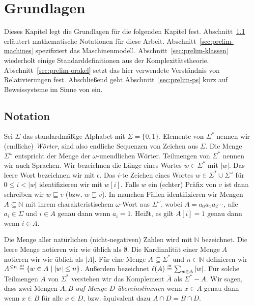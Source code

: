 \chapter{Grundlagen}\label{chap:prelim}

Dieses Kapitel legt die Grundlagen für die folgenden Kapitel fest. Abschnitt~\ref{sec:notation} erläutert mathematische Notationen für diese Arbeit. Abschnitt~\ref{sec:prelim-machines} spezifiziert das Maschinenmodell.  Abschnitt~\ref{sec:prelim-klassen} wiederholt einige Standarddefinitionen aus der Komplexitätstheorie. Abschnitt~\ref{sec:prelim-orakel} setzt das hier verwendete Verständnis von Relativierungen fest. Abschließend geht Abschnitt~\ref{sec:prelim-ps} kurz auf Beweissysteme im Sinne von \textcite{cook_relative_1979} ein.

\section{Notation}\label{sec:notation}

Sei $\Sigma$ das standardmäßige Alphabet mit $\Sigma=\{0,1\}$. Elemente von $\Sigma^*$ nennen wir (endliche) \emph{Wörter}, sind also endliche Sequenzen von Zeichen aus $\Sigma$. Die Menge $\Sigma^\omega$ entspricht der Menge der $\omega$-unendlichen Wörter. Teilmengen von $\Sigma^*$ nennen wir auch Sprachen. Wir bezeichnen die Länge eines Wortes $w\in\Sigma^*$ mit $|w|$. Das leere Wort bezeichnen wir mit $\epsilon$. Das $i$-te Zeichen eines Wortes $w\in\Sigma^*\cup\Sigma^\omega$ für $0\leq i< |w|$ identifizieren wir mit $w[i]$. 
Falls $w$ ein (echter) Präfix von $v$ ist dann schreiben wir $w \sqsubseteq v$ (bzw. $w\sqsubsetneq v$).
In manchen Fällen identifizieren wir Mengen $A\subseteq\mathbb N$ mit ihrem charakteristischem $\omega$-Wort aus $\Sigma^\omega$, wobei $A=a_0a_1a_2\cdots$, alle $a_i\in\Sigma$ und $i\in A$ genau dann wenn $a_i=1$.
Heißt, es gilt $A[i] = 1$ genau dann wenn $i\in A$.

Die Menge aller natürlichen (nicht-negativen) Zahlen wird mit $\mathbb N$ bezeichnet. Die leere Menge notieren wir wie üblich als $\emptyset$. Die Kardinalität einer Menge $A$ notieren wir wie üblich als $|A|$. Für eine Menge $A\subseteq\Sigma^*$ und $n\in \mathbb N$ definieren wir $A^{\leq n} \stackrel{\text{\smash{\tiny df}}}{=} \{ w\in A \mid |w|\leq n\}$. 
Außerdem bezeichnet $\ell(A)\stackrel{\text{\smash{\tiny df}}}{=}\sum_{w\in A} |w|$. Für solche Teilmengen $A$ von $\Sigma^*$ verstehen wir das Komplement $\overline{A}$ als $\Sigma^*-A$.
Wir sagen, dass zwei Mengen $A, B$ \emph{auf Menge $D$ übereinstimmen} wenn $x\in A$ genau dann wenn $x\in B$ für alle $x\in D$, bzw. äquivalent dazu $A\cap D= B\cap D$.

